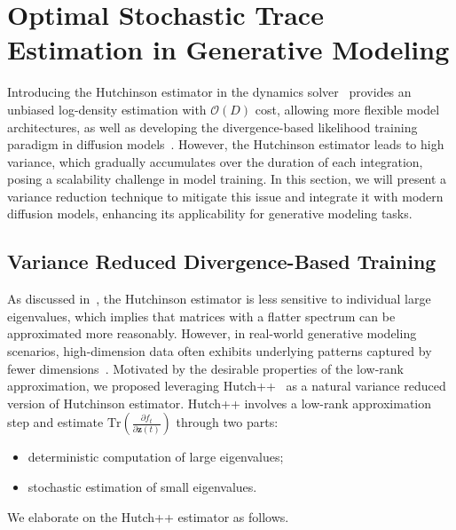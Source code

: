 \section{Optimal Stochastic Trace Estimation in Generative Modeling}
Introducing the Hutchinson estimator in the dynamics solver~\citep{FFJORD} provides an unbiased log-density estimation with $\mathcal{O}(D)$ cost, allowing more flexible model architectures, as well as developing the divergence-based likelihood training paradigm in diffusion models~\cite{song2020sliced, forward_backward_SDE, VSDM, provably_schrodinger_bridge}.
However, the Hutchinson estimator leads to high variance, which gradually accumulates over the duration of each integration, posing a scalability challenge in model training. 
In this section, we will present a variance reduction technique to mitigate this issue and integrate it with modern diffusion models, enhancing its applicability for generative modeling tasks.


\subsection{Variance Reduced Divergence-Based Training} \label{sec: variance_reduction}
As discussed in~\citet{hutch_pp}, the Hutchinson estimator is less sensitive to individual large eigenvalues, which implies that matrices with a flatter spectrum can be approximated more reasonably. 
However, in real-world generative modeling scenarios, high-dimension data often exhibits underlying patterns captured by fewer dimensions~\citep{van2008tsne, ng2011sparse, VAE, carlsson2009topology}.
Motivated by the desirable properties of the low-rank approximation,
we proposed leveraging Hutch++~\citep{hutch_pp} as a natural variance reduced version of Hutchinson estimator. Hutch++ involves a low-rank approximation step and estimate $ \mathrm{Tr} \left( \frac{\partial f_t}{\partial \mathbf{z}(t)} \right)$ through two parts:
\begin{itemize}
    \item deterministic computation of large eigenvalues;
    \item stochastic estimation of small eigenvalues.
\end{itemize}
We elaborate on the Hutch++ estimator as follows.

